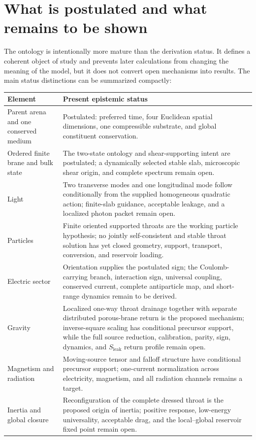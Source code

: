\section{What is postulated and what remains to be shown}

The ontology is intentionally more mature than the derivation status. It defines
a coherent object of study and prevents later calculations from changing the
meaning of the model, but it does not convert open mechanisms into results. The
main status distinctions can be summarized compactly:

\begin{center}
\begin{tabularx}{\textwidth}{@{}L{0.29\textwidth}X@{}}
\toprule
\textbf{Element} & \textbf{Present epistemic status} \\
\midrule
Parent arena and one conserved medium & Postulated: preferred time, four Euclidean spatial dimensions, one compressible substrate, and global constituent conservation. \\
Ordered finite brane and bulk state & The two-state ontology and shear-supporting intent are postulated; a dynamically selected stable slab, microscopic shear origin, and complete spectrum remain open. \\
Light & Two transverse modes and one longitudinal mode follow conditionally from the supplied homogeneous quadratic action; finite-slab guidance, acceptable leakage, and a localized photon packet remain open. \\
Particles & Finite oriented supported throats are the working particle hypothesis; no jointly self-consistent and stable throat solution has yet closed geometry, support, transport, conversion, and reservoir loading. \\
Electric sector & Orientation supplies the postulated sign; the Coulomb-carrying branch, interaction sign, universal coupling, conserved current, complete antiparticle map, and short-range dynamics remain to be derived. \\
Gravity & Localized one-way throat drainage together with separate distributed porous-brane return is the proposed mechanism; inverse-square scaling has conditional precursor support, while the full source reduction, calibration, parity, sign, dynamics, and \(S_{\mathrm{leak}}\) return profile remain open. \\
Magnetism and radiation & Moving-source tensor and falloff structure have conditional precursor support; one-current normalization across electricity, magnetism, and all radiation channels remains a target. \\
Inertia and global closure & Reconfiguration of the complete dressed throat is the proposed origin of inertia; positive response, low-energy universality, acceptable drag, and the local--global reservoir fixed point remain open. \\
\bottomrule
\end{tabularx}
\end{center}

